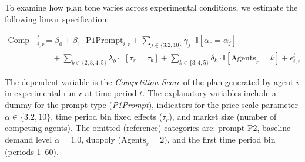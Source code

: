 To examine how plan tone varies across experimental conditions, we estimate the following linear specification:


\begin{equation}\label{eq:comp_score}
\begin{aligned}
    \text{Comp Score}^t_{i,r} &= \beta_0 + \beta_1 \cdot \text{P1Prompt}_{i,r} 
    + \sum_{j \in \{3.2, 10\}} \gamma_j \cdot \mathbb{I}[\alpha_r = \alpha_j] \\
    &\quad + \sum_{b \in \{2, 3, 4, 5\}} \lambda_b \cdot \mathbb{I}[\tau_r = \tau_b] 
    + \sum_{k \in \{3, 4, 5\}} \delta_k \cdot \mathbb{I}[\text{Agents}_r = k] 
    + \epsilon_{i,r}^t
\end{aligned}
\end{equation}


The dependent variable is the \textit{Competition Score} of the plan generated by agent $i$ in experimental run $r$ at time period $t$. The explanatory variables include a dummy for the prompt type (\textit{P1Prompt}), indicators for the price scale parameter $\alpha \in \{3.2, 10\}$, time period bin fixed effects ($\tau_r$), and market size (number of competing agents). The omitted (reference) categories are: prompt P2, baseline demand level $\alpha = 1.0$, duopoly ($\text{Agents}_r = 2$), and the first time period bin (periods 1–60).

